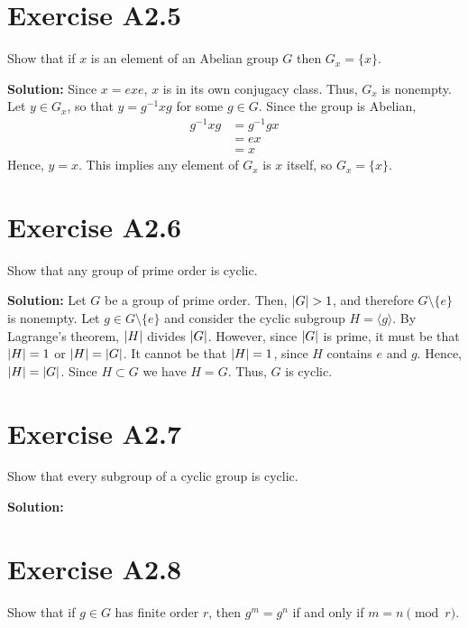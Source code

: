 \documentclass{book}
\begin{document}
\section*{Exercise A2.5}
    Show that if $x$ is an element of an Abelian group $G$ then $G_x = \{x\}$.
    
    \textbf{Solution:} Since $x = exe$, $x$ is in its own conjugacy class. Thus, $G_x$ is nonempty. Let $y \in G_x$, so that $y = g^{-1}x g$ for some $g\in G$. Since the group is Abelian,
    \begin{align}
        g^{-1}xg &= g^{-1}g x \\
        &= ex \\
        &= x
    \end{align}
    Hence, $y=x$. This implies any element of $G_x$ is $x$ itself, so $G_x = \{x\}$.
    
\section*{Exercise A2.6}
    Show that any group of prime order is cyclic.
    
    \textbf{Solution:} Let $G$ be a group of prime order. Then, $\abs{G}>1$, and therefore $G\setminus\{e\}$ is nonempty. Let $g \in G\setminus\{e\}$ and consider the cyclic subgroup $H = \langle g \rangle$. By Lagrange's theorem, $\abs{H}$ divides $\abs{G}$. However, since $\abs{G}$ is prime, it must be that $\abs{H} = 1$ or $\abs{H} = \abs{G}$. It cannot be that $\abs{H} =1$, since $H$ contains $e$ and $g$. Hence, $\abs{H} = \abs{G}$. Since $H\subset G$ we have $H = G$. Thus, $G$ is cyclic.

\section*{Exercise A2.7}
    Show that every subgroup of a cyclic group is cyclic.
    
    \textbf{Solution:}

\section*{Exercise A2.8}
    Show that if $g\in G$ has finite order $r$, then $g^m = g^n$ if and only if $m=n\pmod{r}$.
    
\end{document}
